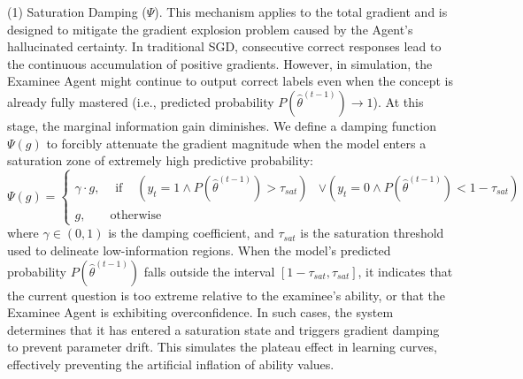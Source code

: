 (1) Saturation Damping ($\Psi$). This mechanism applies to the total gradient and is designed to mitigate the gradient explosion problem caused by the Agent's hallucinated certainty\cite{kim2025splitnet,yazdani2023robust}. In traditional SGD, consecutive correct responses lead to the continuous accumulation of positive gradients. However, in simulation, the Examinee Agent might continue to output correct labels even when the concept is already fully mastered (i.e., predicted probability $P(\hat{\theta}^{(t-1)}) \to 1$). At this stage, the marginal information gain diminishes. We define a damping function $\Psi(g)$ to forcibly attenuate the gradient magnitude when the model enters a saturation zone of extremely high predictive probability:
\begin{equation}
    \Psi(g) = 
    \begin{cases} 
    \gamma \cdot g, & \begin{aligned} 
                        \text{if } & (y_t=1 \land P(\hat{\theta}^{(t-1)}) > \tau_{sat}) 
                                   & \lor (y_t=0 \land P(\hat{\theta}^{(t-1)}) < 1 - \tau_{sat}) 
                      \end{aligned} \\
    g, & \text{otherwise}
    \end{cases}
\end{equation}
where $\gamma \in (0, 1)$ is the damping coefficient, and $\tau_{sat}$ is the saturation threshold used to delineate low-information regions. When the model's predicted probability $P(\hat{\theta}^{(t-1)})$ falls outside the interval $[1 - \tau_{sat}, \tau_{sat}]$, it indicates that the current question is too extreme  relative to the examinee's ability, or that the Examinee Agent is exhibiting overconfidence. In such cases, the system determines that it has entered a saturation state and triggers gradient damping to prevent parameter drift. This simulates the plateau effect in learning curves, effectively preventing the artificial inflation of ability values.

